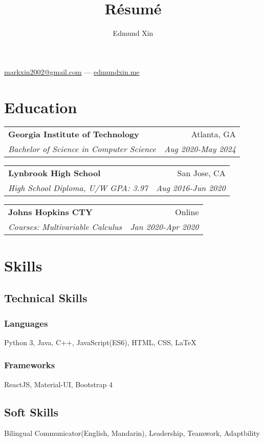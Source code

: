 \documentclass[letterpaper,11pt]{article}
\makeatletter
\renewcommand{\maketitle}{
  \begin{center}
  {\huge\bfseries
  \theauthor}

  \vspace{0.25em}

  \href{mailto:markxin2002@gmail.com}{markxin2002@gmail.com} --- \href{https://edmundxin.me}{edmundxin.me}

  \end{center}
}
\newcommand{\resumeSubheading}[4]{
  \vspace{0.25em}
  \begin{tabular*}{0.97\textwidth}[t]{l@{\extracolsep{\fill}}r}
    \textbf{#1} & #2 \\
    \textit{\small#3} & \textit{\small #4} \\
  \end{tabular*}\vspace{0.25em}
}
\makeatother
\begin{document}
\title{R\'esum\'e}
\author{Edmund Xin}

\maketitle

\section{Education}

\resumeSubheading{Georgia Institute of Technology}
{Atlanta, GA}{Bachelor of Science in Computer Science}{Aug 2020-May 2024}


\resumeSubheading{Lynbrook High School}
{San Jose, CA}{High School Diploma, U/W GPA: 3.97}{Aug 2016-Jun 2020}

\resumeSubheading{Johns Hopkins CTY}
{Online}{Courses: Multivariable Calculus}{Jan 2020-Apr 2020}

\section{Skills}

\begin{multicols}{2}
\subsection{Technical Skills}

\subsubsection{Languages}

\begin{adjustwidth}{4em}{}
Python 3, Java, C++, JavaScript(ES6), HTML, CSS, {\LaTeX}
\end{adjustwidth}

\subsubsection{Frameworks}

\begin{adjustwidth}{4em}{}
ReactJS, Material-UI, Bootstrap 4
\end{adjustwidth}

\columnbreak

\subsection{Soft Skills}

\begin{adjustwidth}{2em}{}
Bilingual Communicator(English, Mandarin), Leadership, Teamwork, Adaptbility
\end{adjustwidth}

\end{multicols}
\end{document}
